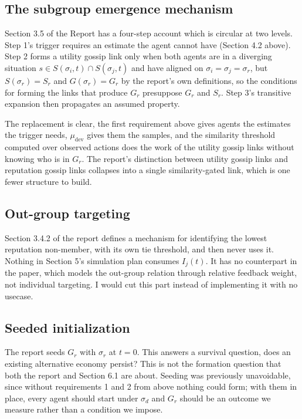 \documentclass[12pt]{article}
\begin{document}
\subsection{The subgroup emergence mechanism}
Section 3.5 of the Report has a four-step account which is circular at two levels. Step 1's trigger requires an estimate the agent
cannot have (Section 4.2 above). Step 2 forms a utility gossip link only when both agents are in a diverging
situation $s \in S(\sigma_i,t) \cap S(\sigma_j,t)$ and have aligned on $\sigma_i = \sigma_j =
\sigma_r$, but $S(\sigma_r) = S_r$ and $G(\sigma_r) = G_r$ by the report's own definitions, so the
conditions for forming the links that produce $G_r$ presuppose $G_r$ and $S_r$. Step 3's transitive
expansion then propagates an assumed property.
 
The replacement is clear, the first requirement above gives agents the estimates the trigger needs, $\mu_\text{dev}$
gives them the samples, and the similarity threshold computed over observed actions does the work of the
utility gossip links without knowing who is in $G_r$. The report's distinction between utility gossip links
and reputation gossip links collapses into a single similarity-gated link, which is one fewer structure to
build.

\subsection{Out-group targeting}
Section 3.4.2 of the report defines a mechanism for identifying the lowest reputation non-member, with its own tie
threshold, and then never uses it. Nothing in Section 5's simulation plan consumes $I_j(t)$. It has no
counterpart in the paper, which models the out-group relation through relative feedback weight, not
individual targeting. I would cut this part instead of implementing it with no usecase.
 
\subsection{Seeded initialization}
The report seeds $G_r$ with $\sigma_r$ at $t = 0$. This answers a survival question, does an existing
alternative economy persist? This is not the formation question that both the report and Section 6.1 are
about. Seeding was previously unavoidable, since without requirements 1 and 2 from above nothing could form; with them in place,
every agent should start under $\sigma_d$ and $G_r$ should be an outcome we measure rather than a condition
we impose.
\end{document}
